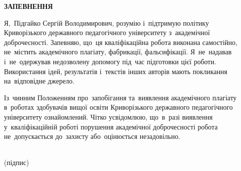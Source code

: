 \thispagestyle{empty}

\begin{center}
\textbf{ЗАПЕВНЕННЯ}
\end{center}

Я,~Підгайко Сергій Володимирович, розумію і~підтримую політику Криворізького державного педагогічного університету з~академічної доброчесності. Запевняю, що~ця кваліфікаційна робота виконана самостійно, не~містить академічного плагіату, фабрикації, фальсифікації. Я~не~надавав і~не~одержував недозволену допомогу під~час підготовки цієї роботи. Використання ідей, результатів і~текстів інших авторів мають покликання на~відповідне джерело.

\vspace{0.5em}

Із~чинним Положенням про~запобігання та~виявлення академічного плагіату в~роботах здобувачів вищої освіти Криворізького державного педагогічного університету ознайомлений. Чітко усвідомлюю, що~в~разі виявлення у~кваліфікаційній роботі порушення академічної доброчесності робота не~допускається до~захисту або~оцінюється незадовільно.

\vspace{3cm}

\noindent\hfill\begin{minipage}{0.4\linewidth}
\noindent\hfill\underline{\hspace{5cm}}\\[2pt]
\hfill{\footnotesize (підпис)}
\end{minipage}

\clearpage
